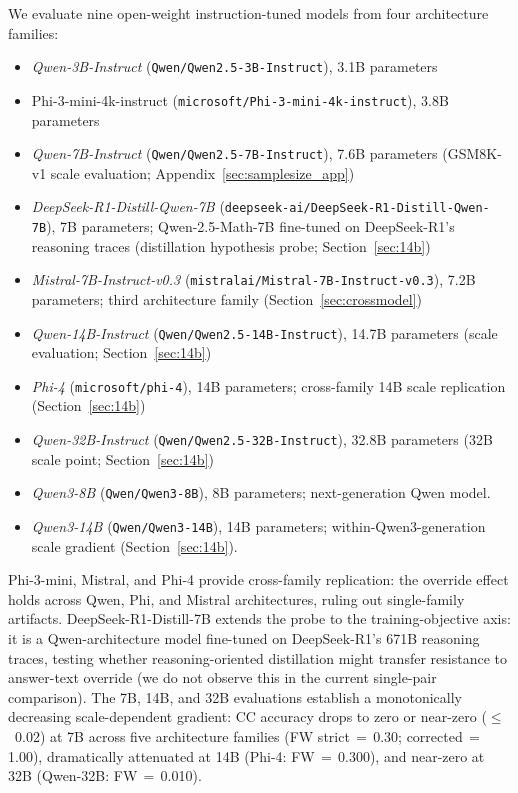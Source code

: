 \documentclass{article}
\theoremstyle{definition}
\theoremstyle{definition}
\newcommand{\SBCCFW}{1.00}
\newcommand{\PHIFOURCCFW}{0.300}
\newcommand{\QWTBCCFW}{0.010}
\begin{document}
We evaluate nine open-weight instruction-tuned models from four architecture families:
\begin{itemize}
  \item \emph{Qwen-3B-Instruct} (\texttt{Qwen/Qwen2.5-3B-Instruct}), 3.1B parameters
  \item Phi-3-mini-4k-instruct
    (\texttt{microsoft/Phi-3-mini-4k-instruct}), 3.8B parameters
  \item \emph{Qwen-7B-Instruct} (\texttt{Qwen/Qwen2.5-7B-Instruct}), 7.6B parameters (GSM8K-v1 scale evaluation; Appendix~\ref{sec:samplesize_app})
  \item \emph{DeepSeek-R1-Distill-Qwen-7B} (\texttt{deepseek-ai/DeepSeek-R1-Distill-Qwen-7B}), 7B parameters; Qwen-2.5-Math-7B fine-tuned on DeepSeek-R1's reasoning traces (distillation hypothesis probe; Section~\ref{sec:14b})
  \item \emph{Mistral-7B-Instruct-v0.3} (\texttt{mistralai/Mistral-7B-Instruct-v0.3}), 7.2B parameters; third architecture family (Section~\ref{sec:crossmodel})
  \item \emph{Qwen-14B-Instruct} (\texttt{Qwen/Qwen2.5-14B-Instruct}), 14.7B parameters (scale evaluation; Section~\ref{sec:14b})
  \item \emph{Phi-4} (\texttt{microsoft/phi-4}), 14B parameters; cross-family 14B scale replication (Section~\ref{sec:14b})
  \item \emph{Qwen-32B-Instruct} (\texttt{Qwen/Qwen2.5-32B-Instruct}), 32.8B parameters (32B scale point; Section~\ref{sec:14b})
  \item \emph{Qwen3-8B} (\texttt{Qwen/Qwen3-8B}), 8B parameters; next-generation Qwen model.
  \item \emph{Qwen3-14B} (\texttt{Qwen/Qwen3-14B}), 14B parameters; within-Qwen3-generation scale gradient (Section~\ref{sec:14b}).
\end{itemize}
Phi-3-mini, Mistral, and Phi-4 provide cross-family replication: the override
effect holds across Qwen, Phi, and Mistral architectures, ruling out
single-family artifacts. DeepSeek-R1-Distill-7B extends the probe to the
training-objective axis: it is a Qwen-architecture model fine-tuned on
DeepSeek-R1's 671B reasoning traces, testing whether reasoning-oriented
distillation might transfer resistance to answer-text override (we do not observe this in the current single-pair comparison).
The 7B, 14B, and 32B evaluations establish a monotonically decreasing
scale-dependent gradient: CC accuracy drops to zero or near-zero ($\leq$~0.02)
at 7B across five architecture families
(FW strict$\,{=}\,0.30$; corrected$\,{=}\,$\SBCCFW),
dramatically attenuated at 14B (Phi-4: FW\,$=$\,\PHIFOURCCFW), and
near-zero at 32B (Qwen-32B: FW\,$=$\,\QWTBCCFW).
\end{document}
